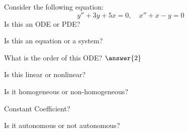 \documentclass{ximera}
\begin{document}
\begin{exercise}
    Consider the following equation:  
    \[
        y''+3y+5x=0, \quad x''+x-y=0
    \]
    Is this an ODE or PDE?
    \begin{multipleChoice}
    \end{multipleChoice}
    \begin{problem}
        Is this an equation or a system?
        \begin{multipleChoice}
        \end{multipleChoice}
        
        \begin{problem}
            What is the order of this ODE? $\answer{2}$
            
            \begin{problem}
                Is this linear or nonlinear?
                \begin{multipleChoice}
                \end{multipleChoice}
                
                \begin{problem}
                    Is it homogeneous or non-homogeneous?
                    \begin{multipleChoice}
                    \end{multipleChoice}
                    
                    \begin{problem}
                        Constant Coefficient?
                        \begin{multipleChoice}
                        \end{multipleChoice}
                    \end{problem}
                \end{problem}
            \end{problem}
        \end{problem}
    \end{problem}
    \begin{problem}
        Is it autonomous or not autonomous?
        \begin{multipleChoice}
        \end{multipleChoice}
    \end{problem}
\end{exercise}
\end{document}
